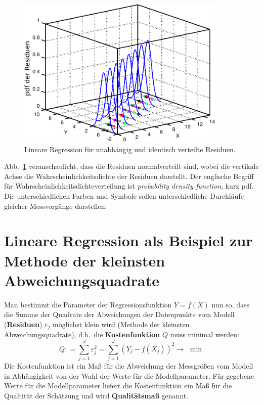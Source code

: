 \begin{figure}
	\begin{center}
		\includegraphics[width=100mm]{02_vorlesung/media/regressionNormalResi_1b.pdf}
		\caption{\label{regressionNormalResi} Lineare Regression für unabhängig und
			identisch verteilte Residuen.}
	\end{center}
\end{figure}

Abb.~\ref{regressionNormalResi} veranschaulicht, dass die Residuen normalverteilt sind, wobei die vertikale Achse die Wahrscheinlichkeitsdichte der Residuen darstellt. Der englische Begriff für Wahr\-schein\-lich\-keits\-dichte\-ver\-teil\-ung ist \textsl{probability density function}, kurz pdf. Die unterschiedlichen
Farben und Symbole sollen unterschiedliche Durchläufe gleicher Messvorgänge darstellen.

\section{Lineare Regression als Beispiel zur Methode der kleinsten Abweichungsquadrate}
Man bestimmt die Parameter der Regressionsfunktion $Y =
f(X)$ nun so, dass die Summe der Quadrate der
Abweichungen der Datenpunkte vom Modell (\textbf{Residuen}) $\varepsilon_j $ möglichst klein wird
(Methode der kleinsten Abweichungsquadrate),
d.h.\ die \textbf{Kostenfunktion} $Q$ muss minimal werden:
\begin{equation}
Q: = \sum\limits_{j = 1}^J {\varepsilon_j ^2 = } \sum\limits_{j = 1}^J {(Y_j
	- f(X_j ))^2 \to } \,\,\min
\label{eq:Minimimierung-kleinster-Fehlerquadrate}
\end{equation}
Die Kostenfunktion ist ein Maß für die Abweichung der Messgrößen vom Modell in Abhängigkeit von der
Wahl der Werte für die Modellparameter. Für gegebene Werte für die Modellparameter liefert die
Kostenfunktion ein Maß für die Qualtität der Schätzung und wird \textbf{Qualitätsmaß} genannt.

